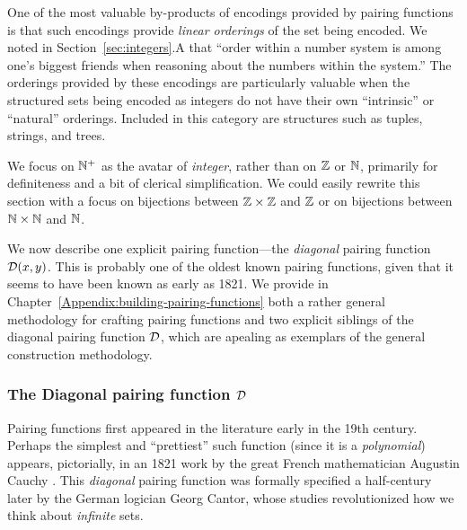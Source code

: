 One of the most valuable by-products of encodings provided by pairing
functions is that such encodings provide {\em linear orderings} of the
set being encoded.  We noted in Section~\ref{sec:integers}.A that
``order within a number system is among one's biggest friends when
reasoning about the numbers within the system.''  The orderings
provided by these encodings are particularly valuable when the
structured sets being encoded as integers do not have their own
``intrinsic'' or ``natural'' orderings.  Included in this category are
structures such as tuples, strings, and trees.

\bigskip

\noindent {}
\bigskip

We focus on $\mathbb{N}^+$ as the avatar of {\it integer}, rather than on $\mathbb{Z}$
or $\mathbb{N}$, primarily for definiteness and a bit of clerical
simplification.  We could easily rewrite this section with a focus on
bijections between $\mathbb{Z} \times \mathbb{Z}$ and $\mathbb{Z}$ or on bijections between
$\mathbb{N} \times \mathbb{N}$ and $\mathbb{N}$.

\bigskip

We now describe one explicit pairing function---the {\em diagonal}
pairing function $\mbox{$\cal D$}(x,y)$.  This is probably one of the oldest known
pairing functions, given that it seems to have been known as early as
1821.  We provide in Chapter~\ref{Appendix:building-pairing-functions}
both a rather general methodology for crafting pairing functions and
two explicit siblings of the diagonal pairing function $\mbox{$\cal D$}$, which are
apealing as exemplars of the general construction methodology.

\subsubsection{The Diagonal pairing function $\mbox{$\cal D$}$}
\label{sec:diag-pair-fn}

Pairing functions first appeared in the literature early in the 19th
century.  Perhaps the simplest and ``prettiest'' such function (since
it is a {\em polynomial}) appears, pictorially, in an 1821 work by the
great French mathematician Augustin Cauchy \cite{Cauchy21}.
%
This {\em diagonal} pairing function was formally specified a
half-century later by the German logician Georg Cantor,
%
whose studies \cite{Cantor74,Cantor78} revolutionized how we think
about {\em infinite} sets.

